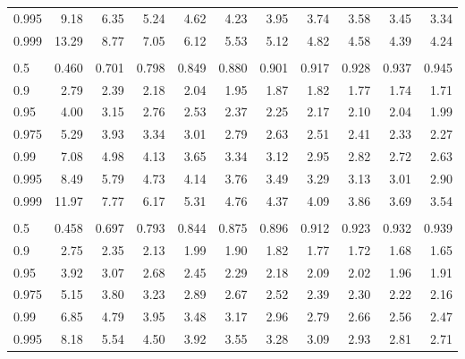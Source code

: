 \documentclass[]{article}
\begin{document}
\begin{table}[H]
\begin{tabular}{lrrrrrrrrrr}
\hspace{1em}0.995 & 9.18 & 6.35 & 5.24 & 4.62 & 4.23 & 3.95 & 3.74 & 3.58 & 3.45 & 3.34\\
\hspace{1em}0.999 & 13.29 & 8.77 & 7.05 & 6.12 & 5.53 & 5.12 & 4.82 & 4.58 & 4.39 & 4.24\\
\addlinespace[0.3em]
\multicolumn{11}{l}{\textbf{$k_2=60$}}\\
\hspace{1em}0.5 & 0.460 & 0.701 & 0.798 & 0.849 & 0.880 & 0.901 & 0.917 & 0.928 & 0.937 & 0.945\\
\hspace{1em}0.9 & 2.79 & 2.39 & 2.18 & 2.04 & 1.95 & 1.87 & 1.82 & 1.77 & 1.74 & 1.71\\
\hspace{1em}0.95 & 4.00 & 3.15 & 2.76 & 2.53 & 2.37 & 2.25 & 2.17 & 2.10 & 2.04 & 1.99\\
\hspace{1em}0.975 & 5.29 & 3.93 & 3.34 & 3.01 & 2.79 & 2.63 & 2.51 & 2.41 & 2.33 & 2.27\\
\hspace{1em}0.99 & 7.08 & 4.98 & 4.13 & 3.65 & 3.34 & 3.12 & 2.95 & 2.82 & 2.72 & 2.63\\
\hspace{1em}0.995 & 8.49 & 5.79 & 4.73 & 4.14 & 3.76 & 3.49 & 3.29 & 3.13 & 3.01 & 2.90\\
\hspace{1em}0.999 & 11.97 & 7.77 & 6.17 & 5.31 & 4.76 & 4.37 & 4.09 & 3.86 & 3.69 & 3.54\\
\addlinespace[0.3em]
\multicolumn{11}{l}{\textbf{$k_2=120$}}\\
\hspace{1em}0.5 & 0.458 & 0.697 & 0.793 & 0.844 & 0.875 & 0.896 & 0.912 & 0.923 & 0.932 & 0.939\\
\hspace{1em}0.9 & 2.75 & 2.35 & 2.13 & 1.99 & 1.90 & 1.82 & 1.77 & 1.72 & 1.68 & 1.65\\
\hspace{1em}0.95 & 3.92 & 3.07 & 2.68 & 2.45 & 2.29 & 2.18 & 2.09 & 2.02 & 1.96 & 1.91\\
\hspace{1em}0.975 & 5.15 & 3.80 & 3.23 & 2.89 & 2.67 & 2.52 & 2.39 & 2.30 & 2.22 & 2.16\\
\hspace{1em}0.99 & 6.85 & 4.79 & 3.95 & 3.48 & 3.17 & 2.96 & 2.79 & 2.66 & 2.56 & 2.47\\
\hspace{1em}0.995 & 8.18 & 5.54 & 4.50 & 3.92 & 3.55 & 3.28 & 3.09 & 2.93 & 2.81 & 2.71\\

\end{tabular}
\end{table}
\end{document}
